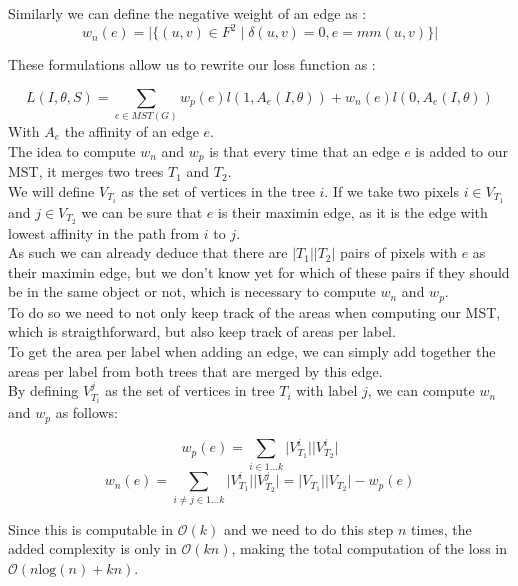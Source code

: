 Similarly we can define the negative weight of an edge as :
\begin{equation*}
	w_n(e)=\lvert \{(u,v)\in F^2 \;|\;\delta(u,v)=0, e=mm(u,v) \}   \rvert
\end{equation*}

These formulations allow us to rewrite our loss function as :

\begin{equation*}
	L(I,\theta,S) = \sum_{e\in MST(G)} w_p(e)l(1,A_e(I,\theta)) + w_n(e)l(0,A_e(I,\theta))
\end{equation*}
With $A_e$ the affinity of an edge $e$.\\

The idea to compute $w_n$ and $w_p$ is that every time that an edge $e$ is
added to our MST, it merges two trees $T_1$ and $T_2$.\\
We will define $V_{T_i}$ as the set of vertices in the tree $i$.
If we take two pixels $i \in V_{T_1}$ and $j \in V_{T_2}$ we can be sure that $e$ is
their maximin edge, as it is the edge with lowest affinity in the path from $i$
to $j$. \\
As such we can already deduce that there are $|T_1||T_2|$ pairs of
pixels with $e$ as their maximin edge, but we don't know yet for which of these
pairs if they should be in the same object or not, which is necessary to
compute $w_n$ and $w_p$.\\

To do so we need to not only keep track of the areas when computing our MST,
which is straigthforward, but also keep track of areas per label.\\
To get the area per label when adding an edge, we can simply add together the
areas per label from both trees that are merged by this edge.\\

By defining $V_{T_i}^j$ as the set of vertices in tree $T_i$ with label $j$, we
can compute $w_n$ and $w_p$ as follows: 

\[
	w_p(e) = \sum_{i\in{1\ldots k}} \lvert V_{T_1}^i \rvert \lvert V_{T_2}^i \rvert
\]
\[
	w_n(e) = \sum_{i\neq j \in{1\ldots k}} \lvert V_{T_1}^i \rvert \lvert
	V_{T_2}^j \rvert = \lvert V_{T_1} \rvert \lvert V_{T_2} \rvert - w_p(e)
\]

Since this is computable in $\mathcal{O}(k)$ and we need to do this step $n$
times, the added complexity is only in $\mathcal{O}(kn)$, making the total
computation of the loss in $\mathcal{O}(n\text{log}(n) + kn)$.\\

